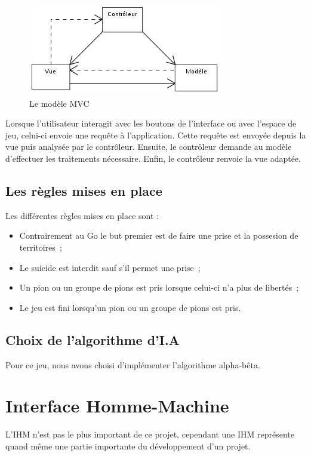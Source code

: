 \documentclass[11pt,a4paper]{article}
\begin{document}
	\begin{figure}[!ht]
	\includegraphics{ModeleMVC.png}
	\caption{Le modèle MVC}
	\label{modeleMVC}
	\end{figure}

	Lorsque l'utilisateur interagit avec les boutons de l'interface ou avec
	l'espace de jeu, celui-ci envoie une requête à l'application.
	Cette requête est envoyée depuis la vue puis analysée par le contrôleur.
	Ensuite, le contrôleur demande au modèle d'effectuer les traitements
	nécessaire. Enfin, le contrôleur renvoie la vue adaptée.

	\subsection{Les règles mises en place}
		\label{regles}

	Les différentes règles mises en place sont :
	
	\begin{itemize}
		\item Contrairement au Go le but premier est de faire une prise et la
		possesion de territoires~;
		\item Le suicide est interdit sauf s'il permet une prise~;
		\item Un pion ou un groupe de pions est pris lorsque celui-ci n'a plus de
		libertés~;
		\item Le jeu est fini lorsqu'un pion ou un groupe de pions est pris.
	\end{itemize}

	\subsection{Choix de l'algorithme d'I.A}
	Pour ce jeu, nous avons choisi d'implémenter l'algorithme alpha-bêta.
\clearpage		
\section{Interface Homme-Machine}
L'IHM n'est pas le plus important de ce projet, cependant une IHM
représente quand même une partie importante du développement d'un projet.
\end{document}
